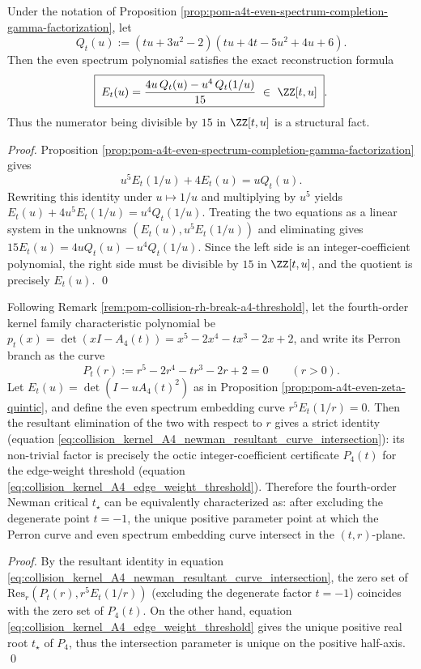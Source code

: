 \begin{proposition}\label{prop:pom-a4t-even-spectrum-gamma-inversion}
Under the notation of Proposition \ref{prop:pom-a4t-even-spectrum-completion-gamma-factorization}, let
\[
Q_t(u):=(tu+3u^2-2)(tu+4t-5u^2+4u+6).
\]
Then the even spectrum polynomial satisfies the exact reconstruction formula
\[
\boxed{\;
E_t(u)=\frac{4u\,Q_t(u)-u^4\,Q_t(1/u)}{15}\ \in\ \ZZ[t,u]\; } .
\]
Thus the numerator being divisible by \(15\) in \(\ZZ[t,u]\) is a structural fact.
\end{proposition}
\begin{proof}
Proposition \ref{prop:pom-a4t-even-spectrum-completion-gamma-factorization} gives
\[
u^5E_t(1/u)+4E_t(u)=uQ_t(u).
\]
Rewriting this identity under \(u\mapsto 1/u\) and multiplying by \(u^5\) yields
\(
E_t(u)+4u^5E_t(1/u)=u^4Q_t(1/u)
\).
Treating the two equations as a linear system in the unknowns \((E_t(u),u^5E_t(1/u))\) and eliminating gives
\(
15E_t(u)=4uQ_t(u)-u^4Q_t(1/u)
\).
Since the left side is an integer-coefficient polynomial, the right side must be divisible by \(15\) in \(\ZZ[t,u]\), and the quotient is precisely \(E_t(u)\). \qed
\end{proof}

\begin{proposition}\label{prop:pom-a4t-newman-resultant-curve-intersection}
Following Remark \ref{rem:pom-collision-rh-break-a4-threshold}, let the fourth-order kernel family characteristic polynomial be
\(
p_t(x)=\det(xI-A_4(t))=x^5-2x^4-tx^3-2x+2
\), and write its Perron branch as the curve
\[
P_t(r):=r^5-2r^4-tr^3-2r+2=0
\qquad(r>0).
\]
Let \(E_t(u)=\det(I-uA_4(t)^2)\) as in Proposition \ref{prop:pom-a4t-even-zeta-quintic}, and define the even spectrum embedding curve
\(
r^5E_t(1/r)=0
\).
Then the resultant elimination of the two with respect to \(r\) gives a strict identity (equation \eqref{eq:collision_kernel_A4_newman_resultant_curve_intersection}):
its non-trivial factor is precisely the octic integer-coefficient certificate \(P_4(t)\) for the edge-weight threshold (equation \eqref{eq:collision_kernel_A4_edge_weight_threshold}).
Therefore the fourth-order Newman critical \(t_\star\) can be equivalently characterized as: after excluding the degenerate point \(t=-1\), the unique positive parameter point at which the Perron curve and even spectrum embedding curve intersect in the \((t,r)\)-plane.
\end{proposition}
\begin{proof}
By the resultant identity in equation \eqref{eq:collision_kernel_A4_newman_resultant_curve_intersection},
the zero set of \(\mathrm{Res}_r(P_t(r),r^5E_t(1/r))\) (excluding the degenerate factor \(t=-1\)) coincides with the zero set of \(P_4(t)\).
On the other hand, equation \eqref{eq:collision_kernel_A4_edge_weight_threshold} gives the unique positive real root \(t_\star\) of \(P_4\), thus the intersection parameter is unique on the positive half-axis. \qed
\end{proof}

